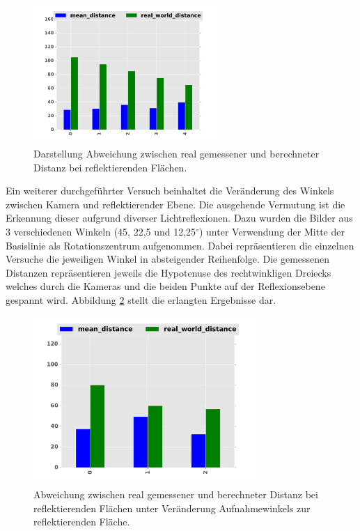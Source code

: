 
\begin{figure}[h]
	\centering
	\includegraphics[width=7cm]{img/reflection/reflection_bar}
	\caption{Darstellung Abweichung zwischen real gemessener und berechneter Distanz bei reflektierenden Flächen.}
	\label{fig:reflection_only}	
\end{figure}

\pagebreak
\noindent
Ein weiterer durchgeführter Versuch beinhaltet die Veränderung des Winkels zwischen Kamera und reflektierender Ebene. Die ausgehende Vermutung ist die Erkennung dieser aufgrund diverser Lichtreflexionen. Dazu wurden die Bilder aus 3 verschiedenen Winkeln (45, 22,5 und 12,25$^\circ$) unter Verwendung der Mitte der Basislinie als Rotationszentrum aufgenommen. Dabei repräsentieren die einzelnen Versuche die jeweiligen Winkel in absteigender Reihenfolge. Die gemessenen Distanzen repräsentieren jeweils die Hypotenuse des rechtwinkligen Dreiecks welches durch die Kameras und die beiden Punkte auf der Reflexionsebene gespannt wird. Abbildung \ref{fig:rotation_angle} stellt die erlangten Ergebnisse dar.\\

\begin{figure}[h]
	\centering
	\includegraphics[width=8.5cm]{img/reflection/angle_bar}
	\caption{Abweichung zwischen real gemessener und berechneter Distanz bei reflektierenden Flächen unter Veränderung Aufnahmewinkels zur reflektierenden Fläche.}
	\label{fig:rotation_angle}
\end{figure}


